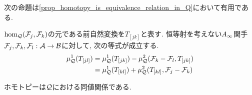 \documentclass[uplatex, a4paper, 14Q, dvipdfmx]{jsarticle}
\begin{document}
次の命題は\cref{prop_homotopy_is_equivalence_relation_in_Q}において有用である. 

\begin{lemma} \label{lem_func_cat_formula}
  $\hom_{\mathcal{Q}}(\mathcal{F}_j,\mathcal{F}_k)$の元である前自然変換を$T_{[jk]}$と表す.
  恒等射を考えない$A_{\infty}$関手$\mathcal{F}_j,\mathcal{F}_k,\mathcal{F}_l : \mathcal{A} \to \mathcal{B}$に対して, 次の等式が成立する. 
  \begin{align*}
    \mu^1_{\mathcal{Q}}(T_{[jl]}) 
    &= \mu^1_{\mathcal{Q}}(T_{[jk]}) - \mu^2_{\mathcal{Q}}(\mathcal{F}_k-\mathcal{F}_l,T_{[jk]}) \\
    &= \mu^1_{\mathcal{Q}}(T_{[kl]}) + \mu^2_{\mathcal{Q}}(T_{[kl]},\mathcal{F}_j-\mathcal{F}_k)
  \end{align*}
\end{lemma}

\begin{theorem} \label{prop_homotopy_is_equivalence_relation_in_Q}
  ホモトピーは$\mathcal{Q}$における同値関係である. 
\end{theorem}
\end{document}
